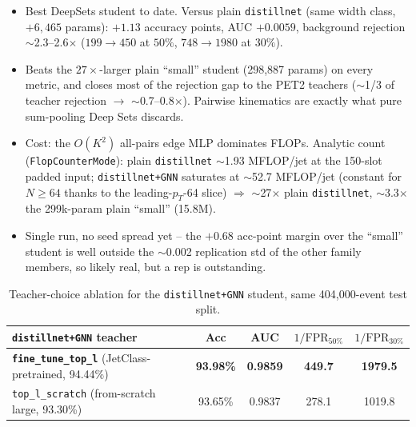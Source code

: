 \begin{itemize}
    \item Best DeepSets student to date. Versus plain \texttt{distillnet}
    (same width class, $+6{,}465$ params): $+1.13$ accuracy points,
    AUC $+0.0059$, background rejection $\sim$2.3--2.6$\times$
    ($199\to450$ at $50\%$, $748\to1980$ at $30\%$).
    \item Beats the $27\times$-larger plain ``small'' student
    (298{,}887 params) on every metric, and closes most of the rejection
    gap to the PET2 teachers ($\sim$1/3 of teacher rejection $\to$
    $\sim$0.7--0.8$\times$). Pairwise kinematics are exactly what pure
    sum-pooling Deep Sets discards.
    \item Cost: the $O(K^2)$ all-pairs edge MLP dominates FLOPs.
    Analytic count (\texttt{FlopCounterMode}): plain \texttt{distillnet}
    $\sim$1.93 MFLOP/jet at the 150-slot padded input;
    \texttt{distillnet+GNN} saturates at $\sim$52.7 MFLOP/jet
    (constant for $N\ge64$ thanks to the leading-$p_T$-64 slice)
    $\Rightarrow$ $\sim$27$\times$ plain \texttt{distillnet},
    $\sim$3.3$\times$ the 299k-param plain ``small'' (15.8M).
    \item Single run, no seed spread yet -- the $+0.68$ acc-point margin
    over the ``small'' student is well outside the $\sim$0.002 replication
    std of the other family members, so likely real, but a rep is
    outstanding.
\end{itemize}

\begin{table}[h]
    \centering
    \small
    \begin{tabular}{lcccc}
        \toprule
        \texttt{distillnet+GNN} teacher & Acc & AUC & $1/\mathrm{FPR}_{50\%}$ & $1/\mathrm{FPR}_{30\%}$ \\
        \midrule
        \textbf{\texttt{fine\_tune\_top\_l}} (JetClass-pretrained, 94.44\%) & \textbf{93.98\%} & \textbf{0.9859} & \textbf{449.7} & \textbf{1979.5} \\
        \texttt{top\_l\_scratch} (from-scratch large, 93.30\%)             & 93.65\% & 0.9837 & 278.1 & 1019.8 \\
        \bottomrule
    \end{tabular}
    \caption{Teacher-choice ablation for the \texttt{distillnet+GNN} student,
    same 404{,}000-event test split.}
    \label{tab:deepsets-gnn-teacher-ablation}
\end{table}

